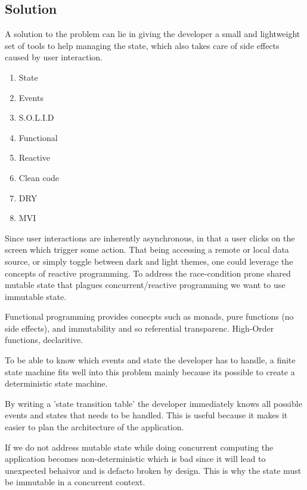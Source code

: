 \subsection{Solution}
\label{subsec:solution}

A solution to the problem can lie in giving the developer a small and lightweight set of tools to help managing the state, 
which also takes care of side effects caused by user interaction.

\begin{enumerate}

    \item State
    \item Events
    \item S.O.L.I.D
    \item Functional 
    \item Reactive
    \item Clean code
    \item DRY
    \item MVI

\end{enumerate}

Since user interactions are inherently asynchronous, in that a user clicks on the screen which trigger some action. 
That being accessing a remote or local data source, or simply toggle between dark and light themes, one could leverage the concepts of reactive programming.
To address the race-condition prone shared mutable state that plagues concurrent/reactive programming we want to use immutable state.

Functional programming provides conecpts such as monads, pure functions (no side effects), and immutability and so referential transparenc.
High-Order functions, declaritive.

To be able to know which events and state the developer has to handle, a finite state machine \cite{fsmWikiPage} fits well into 
this problem mainly because its possible to create a deterministic state machine.

By writing a 'state transition table' the developer immediately knows all possible events and states that needs to be handled.
This is useful because it makes it easier to plan the architecture of the application.

If we do not address mutable state while doing concurrent computing the application becomes non-deterministic
which is bad since it will lead to unexpected behaivor and is defacto broken by design. 
This is why the state must be immutable in a concurrent context.

